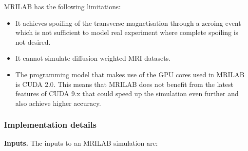 MRILAB has the following limitations:
\begin{itemize}
    
    \item It achieves spoiling of the transverse magnetisation through a zeroing event which is not sufficient to model real experiment where complete spoiling is not desired.
    
    \item It cannot simulate diffusion weighted MRI datasets.
    
    \item The programming model that makes use of the GPU cores used in MRILAB is CUDA 2.0. This means that MRILAB does not benefit from the latest features of CUDA 9.x that could speed up the simulation even further and also achieve higher accuracy.
    
\end{itemize}

\hfill

\subsubsection{Implementation details}

\textbf{Inputs.} The inputs to an MRILAB simulation are:

